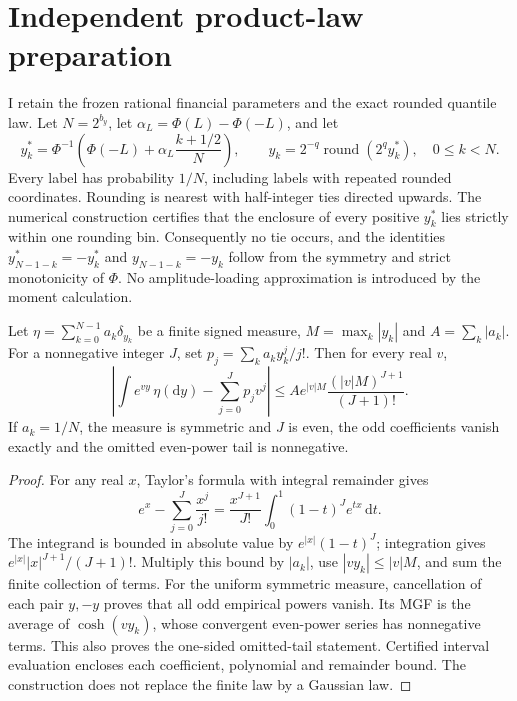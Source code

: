 \section{Independent product-law preparation}
\label{sec:higherdim-preparation-proof}

I retain the frozen rational financial parameters and the exact rounded
quantile law. Let $N=2^{b_y}$, let $\alpha_L=\Phi(L)-\Phi(-L)$, and let
\[
 y_k^*=\Phi^{-1}\!\left(\Phi(-L)+\alpha_L\frac{k+1/2}{N}\right),
 \qquad
 y_k=2^{-q}\operatorname{round}(2^q y_k^*),\quad 0\leq k<N.
\]
Every label has probability $1/N$, including labels with repeated rounded
coordinates. Rounding is nearest with half-integer ties directed upwards.
The numerical construction certifies that the enclosure of every positive
$y_k^*$ lies strictly within one rounding bin. Consequently no tie occurs,
and the identities $y_{N-1-k}^*=-y_k^*$ and $y_{N-1-k}=-y_k$ follow from the
symmetry and strict monotonicity of $\Phi$. No amplitude-loading approximation
is introduced by the moment calculation.

\begin{proposition}
Let $\eta=\sum_{k=0}^{N-1}a_k\delta_{y_k}$ be a finite signed measure,
$M=\max_k|y_k|$ and $A=\sum_k|a_k|$. For a nonnegative integer $J$, set
$p_j=\sum_k a_k y_k^j/j!$. Then for every real $v$,
\[
 \left|\int e^{vy}\,\eta(\mathrm dy)-\sum_{j=0}^{J}p_jv^j\right|
 \leq A e^{|v|M}\frac{(|v|M)^{J+1}}{(J+1)!}.
\]
If $a_k=1/N$, the measure is symmetric and $J$ is even, the odd coefficients
vanish exactly and the omitted even-power tail is nonnegative.
\end{proposition}

\begin{proof}
For any real $x$, Taylor's formula with integral remainder gives
\[
 e^x-\sum_{j=0}^{J}\frac{x^j}{j!}
 =\frac{x^{J+1}}{J!}\int_0^1(1-t)^J e^{tx}\,\mathrm dt.
\]
The integrand is bounded in absolute value by $e^{|x|}(1-t)^J$;
integration gives $e^{|x|}|x|^{J+1}/(J+1)!$. Multiply this bound by
$|a_k|$, use $|vy_k|\leq |v|M$, and sum the finite collection of terms.
For the uniform symmetric measure, cancellation of each pair $y,-y$ proves
that all odd empirical powers vanish. Its MGF is the average of
$\cosh(vy_k)$, whose convergent even-power series has nonnegative terms.
This also proves the one-sided omitted-tail statement. Certified interval
evaluation encloses each coefficient, polynomial and remainder bound.
The construction does not replace the finite law by a Gaussian law.
\end{proof}

